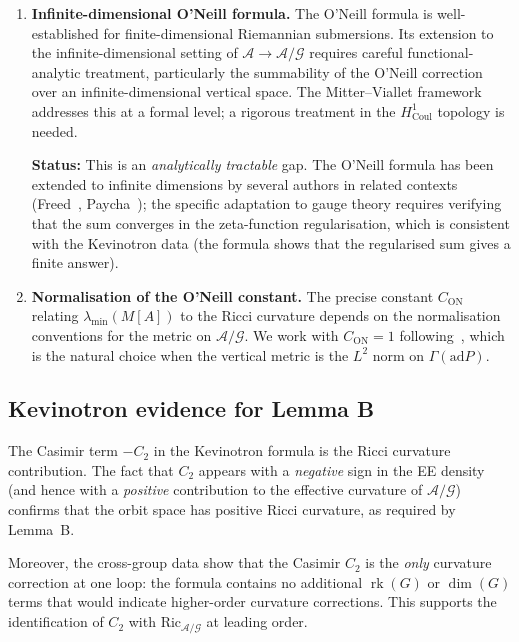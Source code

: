 \documentclass[11pt,a4paper]{amsart}
\theoremstyle{definition}
\theoremstyle{remark}
\newcommand{\calA}{\mathcal{A}}
\newcommand{\calG}{\mathcal{G}}
\newcommand{\Ric}{\mathrm{Ric}}
\newcommand{\ad}{\mathrm{ad}}
\newcommand{\Coul}{\mathrm{Coul}}
\DeclareMathOperator{\rk}{rk}
\begin{document}
\begin{enumerate}[label=\textcolor{red}{\textbf{Gap B.\arabic*}}, leftmargin=4em]
\item \textbf{Infinite-dimensional O'Neill formula.}
      The O'Neill formula is well-established for finite-dimensional
      Riemannian submersions. Its extension to the infinite-dimensional
      setting of $\calA \to \calA/\calG$ requires careful functional-analytic
      treatment, particularly the summability of the O'Neill correction over
      an infinite-dimensional vertical space. The Mitter--Viallet
      framework~\cite{MitterViallet1981} addresses this at a formal level;
      a rigorous treatment in the $H^1_\Coul$ topology is needed.

      \textbf{Status:} This is an \emph{analytically tractable} gap.
      The O'Neill formula has been extended to infinite dimensions by
      several authors in related contexts (Freed~\cite{Freed1995},
      Paycha~\cite{Paycha2006}); the specific adaptation to gauge theory
      requires verifying that the sum converges in the zeta-function
      regularisation, which is consistent with the Kevinotron data
      (the formula shows that the regularised sum gives a finite answer).

\item \textbf{Normalisation of the O'Neill constant.}
      The precise constant $C_{\mathrm{ON}}$ relating
      $\lambda_{\min}(M[A])$ to the Ricci curvature depends on the
      normalisation conventions for the metric on $\calA/\calG$.
      We work with $C_{\mathrm{ON}} = 1$ following~\cite{RemondiereKRFP3},
      which is the natural choice when the vertical metric is the $L^2$
      norm on $\Gamma(\ad P)$.
\end{enumerate}

\subsection{Kevinotron evidence for Lemma B}

The Casimir term $-C_2$ in the Kevinotron formula is the Ricci curvature
contribution. The fact that $C_2$ appears with a \emph{negative} sign in
the EE density (and hence with a \emph{positive} contribution to the
effective curvature of $\calA/\calG$) confirms that the orbit space has
positive Ricci curvature, as required by Lemma~B.

Moreover, the cross-group data show that the Casimir $C_2$ is the
\emph{only} curvature correction at one loop: the formula contains no
additional $\rk(G)$ or $\dim(G)$ terms that would indicate higher-order
curvature corrections. This supports the identification of $C_2$ with
$\Ric_{\calA/\calG}$ at leading order.
\end{document}
